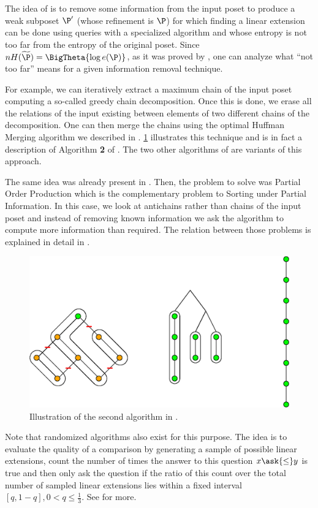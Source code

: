 The idea of \citet*{cardinal:2013} is to remove some information from the input
poset to produce a weak subposet \(\P'\) (whose refinement is \(\P\)) for which
finding a linear extension can be done using  queries with a
specialized algorithm and whose entropy is not too far from the entropy of the
original poset. Since \(n H(\widetilde{\P}) = \BigTheta{\log e(\P)}\), as it
was proved by \citet*{kahn:1995}, one can analyze what ``not too far'' means
for a given information removal technique.

For example, we can iteratively extract a maximum chain of the input poset
computing a so-called greedy chain decomposition. Once this is done, we
erase all the relations of the input existing between elements of two different
chains of the decomposition. One can then merge the chains using the optimal
Huffman Merging algorithm we described in .
\ref{fig:supi/alg2} illustrates this technique and is in fact a description of
Algorithm \textbf{2} of \citet{cardinal:2013}. The two other algorithms of
\citet*{cardinal:2013} are variants of this approach.

The same idea was already present in \citet*{cardinal:2010}. Then, the problem
to solve was Partial Order Production which is the complementary problem to
Sorting under Partial Information. In this case, we look at antichains rather
than chains of the input poset and instead of removing known information we ask
the algorithm to compute more information than required. The relation between
those problems is explained in detail in \cite{DBLP:conf/birthday/CardinalF13}.

\begin{figure}
	\centering
	\includegraphics[height=0.2\textheight]{fig/supi/reduction:diag}
	\caption{\label{fig:supi/alg2} Illustration of the second algorithm in
\citet*{cardinal:2013}.}
\end{figure}


Note that randomized algorithms also exist for this purpose. The idea is to
evaluate the quality of a comparison by generating a sample of possible linear
extensions, count the number of times the answer to this question \(x
\ask{\le} y\) is true and then only ask the question if the ratio of
this count over the total number of sampled linear extensions lies within a
fixed interval $[q, 1-q], 0 < q \le \frac{1}{3}$. See \citet*{huber2006fast} for
more.

